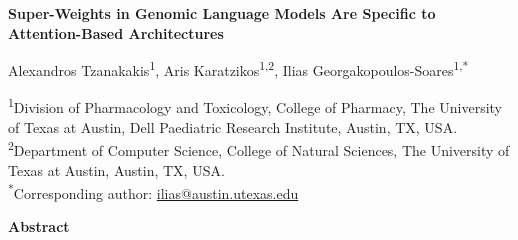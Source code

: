 \documentclass[11pt]{article}
\begin{document}
\begin{center}
{\large\bfseries Super-Weights in Genomic Language Models Are Specific
to Attention-Based Architectures}

\vspace{6pt}
{\normalsize
Alexandros Tzanakakis\textsuperscript{1},
Aris Karatzikos\textsuperscript{1,2},
Ilias Georgakopoulos-Soares\textsuperscript{1,*}
}

\vspace{6pt}
{\small
\textsuperscript{1}Division of Pharmacology and Toxicology, College of
Pharmacy, The University of Texas at Austin, Dell Paediatric Research
Institute, Austin, TX, USA.\\
\textsuperscript{2}Department of Computer Science, College of Natural
Sciences, The University of Texas at Austin, Austin, TX, USA.\\
\textsuperscript{*}Corresponding author:
\href{mailto:ilias@austin.utexas.edu}{ilias@austin.utexas.edu}
}
\end{center}

\vspace{6pt}

\textbf{Abstract}
\end{document}
